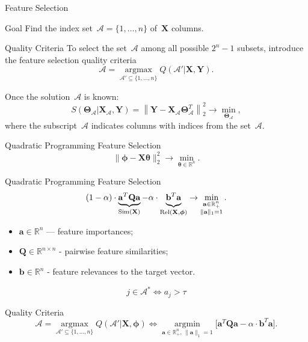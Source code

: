 \documentclass[9pt]{beamer}
\newcommand{\ba}{\mathbf{a}}
\newcommand{\bY}{\mathbf{Y}}
\newcommand{\bX}{\mathbf{X}}
\newcommand{\bQ}{\mathbf{Q}}
\newcommand{\bbR}{\mathbb{R}}
\newcommand{\cA}{\mathcal{A}}
\newcommand{\bphi}{\boldsymbol{\phi}}
\newcommand{\btheta}{\boldsymbol{\theta}}
\newcommand{\bTheta}{\boldsymbol{\Theta}}
\newcommand{\argmin}{\mathop{\arg \min}\limits}
\newcommand{\argmax}{\mathop{\arg \max}\limits}
\begin{document}
\begin{frame}{Feature Selection}
\begin{block}{Goal}
Find the index set~$\cA = \{1, \dots, n\}$ of~$\bX$ columns. 
\end{block}
\begin{block}{Quality Criteria}
To select the set~$\cA$ among all possible $2^n - 1$ subsets, introduce the feature selection quality criteria
\[
\cA = \argmax_{\cA' \subseteq \{1, \dots, n\}} Q(\cA' | \bX, \bY).
\label{eq:subset_selection}
\]
\end{block}
Once the solution~$\cA$ is known:
\[
S(\bTheta_{\cA} | \bX_{\cA}, \bY) = {\left\| \mathbf{Y} - \bX_{\cA}\bTheta^T_{\cA} \right\| }_2^2 \rightarrow\min_{\bTheta_{\cA}},
\]
where the subscript~$\cA$ indicates columns with indices from the set~$\cA$.

\end{frame}
\begin{frame}{Quadratic Programming Feature Selection}
	\[
	\| \bphi - \bX \btheta\|_2^2 \rightarrow\min_{\btheta \in \bbR^{n}}.
	\]
	\begin{block}{Quadratic Programming Feature Selection}
	\vspace{-0.3cm}
	\[
	(1 - \alpha) \cdot \underbrace{\ba^{T} \bQ \ba}_{\text{Sim}(\bX)} - \alpha \cdot \underbrace{\vphantom{()} \mathbf{b}^{T} \ba}_{\text{Rel}(\bX, \bphi)} \rightarrow \min_{\substack{\ba \in \bbR^n_+ \\ \|\ba\|_1=1}}.
	\]
	\vspace{-0.3cm}
	\end{block}
		\begin{itemize}
			\item $\ba \in \bbR^n$ --- feature importances;
			\item $\bQ \in \bbR^{n \times n}$ - pairwise feature similarities;
			\item $\mathbf{b} \in \bbR^n$ - feature relevances to the target vector.
		\end{itemize}
	
	\begin{equation*}
	j \in \mathcal{A}^* \Leftrightarrow a_j > \tau
	\end{equation*}
	
	\begin{block}{Quality Criteria}
	\[
	\cA = \argmax_{\cA' \subseteq \{1, \dots, n\}} Q(\cA' | \bX, \bphi) \Leftrightarrow \argmin_{\ba  \in \bbR^n_+, \, \|\ba\|_1=1} \bigl[\ba^{T} \bQ \ba - \alpha \cdot \mathbf{b}^{T} \ba \bigr].
	\]
	\end{block}
\end{frame}
\end{document}
